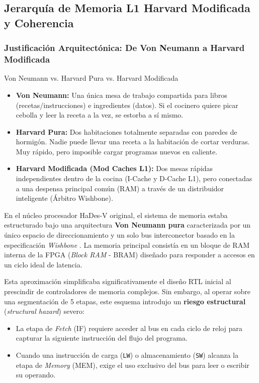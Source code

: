\documentclass[10pt,a4paper]{article}
\begin{document}
\subsection{Jerarquía de Memoria L1 Harvard Modificada y Coherencia}

\subsubsection{Justificación Arquitectónica: De Von Neumann a Harvard Modificada}

\begin{conceptbox}{Von Neumann vs. Harvard Pura vs. Harvard Modificada}
\begin{itemize}
    \item \textbf{Von Neumann:} Una única mesa de trabajo compartida para libros (recetas/instrucciones) e ingredientes (datos). Si el cocinero quiere picar
    cebolla y leer la receta a la vez, se estorba a sí mismo.
    \item \textbf{Harvard Pura:} Dos habitaciones totalmente separadas con paredes de hormigón. Nadie puede llevar una receta a la habitación de cortar verduras.
    Muy rápido, pero imposible cargar programas nuevos en caliente.
    \item \textbf{Harvard Modificada (Mod Caches L1):} Dos mesas rápidas independientes dentro de la cocina (I-Cache y D-Cache L1), pero conectadas a una despensa
    principal común (RAM) a través de un distribuidor inteligente (Árbitro Wishbone).
\end{itemize}
\end{conceptbox}

En el núcleo procesador HaDes-V original, el sistema de memoria estaba estructurado bajo una arquitectura \textbf{Von Neumann pura} caracterizada por un único espacio 
de direccionamiento y un solo bus interconector basado en la especificación \textit{Wishbone} \cite{wishbone_spec}. La memoria principal consistía en un bloque de RAM
interna de la FPGA (\textit{Block RAM} - BRAM) diseñado para responder a accesos en un ciclo ideal de latencia.

Esta aproximación simplificaba significativamente el diseño RTL inicial al prescindir de controladores de memoria complejos. Sin embargo, al operar sobre una 
segmentación de 5 etapas, este esquema introdujo un \textbf{riesgo estructural} (\textit{structural hazard}) severo:
\begin{itemize}
    \item La etapa de \textit{Fetch} (IF) requiere acceder al bus en cada ciclo de reloj para capturar la siguiente instrucción del flujo del programa.
    \item Cuando una instrucción de carga (\texttt{LW}) o almacenamiento (\texttt{SW}) alcanza la etapa de \textit{Memory} (MEM), exige el uso exclusivo del bus para 
    leer o escribir su operando.
\end{itemize}
\end{document}
